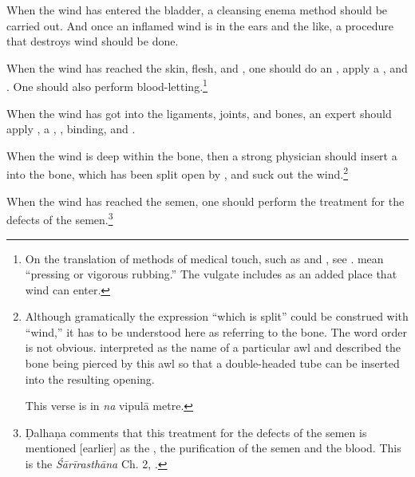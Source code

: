 \begin{translation}
    \item [6] When the wind has entered the bladder, a cleansing enema method
should be carried out. And once an inflamed wind is in the ears and the like,
a procedure that destroys wind should be done.

    \item [7]
    When the wind has reached the skin, flesh, and , one should do 
    an 
    , apply a ,  
     and . One should also 
    perform blood-letting.\footnote{On the translation of methods of 
    medical touch, such as  and , see 
    \cite[122--131]{broo-2021}.   mean “pressing or 
    vigorous rubbing.”  The vulgate includes 
     as an added place that wind can enter.}

    \item[8]
    When the wind has got into the ligaments, joints, and bones, an expert 
    should apply  ,  a ,
    , binding, and .



    \item [9] When the wind is deep within the bone, then a strong
physician should insert a  into the bone, which has
been split open by , and suck out
the wind.\footnote{Although gramatically the expression “which is
    split” could be construed with “wind,” it has to be understood
    here as referring to the bone.  The word order is not obvious. 
     interpreted  as the name of a
    particular awl and described the bone being pierced by this awl so
    that a double-headed tube can be inserted into the resulting
    opening.
    
    This verse is in \emph{na} vipulā metre.}
         
         
          

    \item[10ab]
    When the wind has reached the semen, one should perform the treatment 
    for the defects of the semen.\footnote{Ḍalhaṇa comments 
    \citep[421]{vulgate} that this treatment for the defects of the semen is 
    mentioned [earlier] as the , the purification of the 
    semen and the blood. This is the \emph{Śārīrasthāna} Ch. 2, 
    .}
    

\end{translation}
